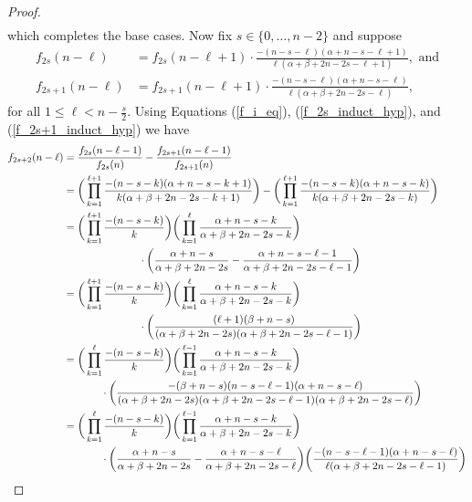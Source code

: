 \documentclass{amsart}
\theoremstyle{plain}
\theoremstyle{remark}
\begin{document}
\begin{proof}
\begin{align*}
\end{align*}
which completes the base cases. Now fix $s\in\{0,\ldots,n-2\}$ and suppose 
\begin{align} \label{f_2s_induct_hyp}
    f_{2s}(n-\ell)&=f_{2s}(n-\ell+1)\cdot\frac{-(n-s-\ell)(\alpha+n-s-\ell+1)}{\ell(\alpha+\beta+2n-2s-\ell+1)},\text{ and} \\
 \label{f_2s+1_induct_hyp}
    f_{2s+1}(n-\ell)&=f_{2s+1}(n-\ell+1)\cdot\frac{-(n-s-\ell)(\alpha+n-s-\ell)}{\ell(\alpha+\beta+2n-2s-\ell)},
\end{align}
for all $1\le \ell<n-\frac{s}{2}$. Using Equations (\ref{f_i_eq}), (\ref{f_2s_induct_hyp}), and (\ref{f_2s+1_induct_hyp}) we have
\begin{align}
f_{2s+2}(n-\ell)&=\frac{f_{2s}(n-\ell-1)}{f_{2s}(n)}-\frac{f_{2s+1}(n-\ell-1)}{f_{2s+1}(n)}\notag \\
&=\bigg(\prod_{k=1}^{\ell+1}\frac{-(n-s-k)(\alpha+n-s-k+1)}{k(\alpha+\beta+2n-2s-k+1)}\bigg)-\bigg(\prod_{k=1}^{\ell+1}\frac{-(n-s-k)(\alpha+n-s-k)}{k(\alpha+\beta+2n-2s-k)}\bigg)\notag \\
&=\bigg(\prod_{k=1}^{\ell+1}\frac{-(n-s-k)}{k}\bigg)\bigg(\prod_{k=1}^\ell\frac{\alpha+n-s-k}{\alpha+\beta+2n-2s-k}\bigg) \notag 
\\&\hspace{1in}\cdot\bigg(\frac{\alpha+n-s}{\alpha+\beta+2n-2s}-\frac{\alpha+n-s-\ell-1}{\alpha+\beta+2n-2s-\ell-1}\bigg)\notag  \\
&=\bigg(\prod_{k=1}^{\ell+1}\frac{-(n-s-k)}{k}\bigg)\bigg(\prod_{k=1}^\ell\frac{\alpha+n-s-k}{\alpha+\beta+2n-2s-k}\bigg) \notag 
\\&\hspace{1in}\cdot\bigg(\frac{(\ell+1)(\beta+n-s)}{(\alpha+\beta+2n-2s)(\alpha+\beta+2n-2s-\ell-1)}\bigg)\notag \\
&=\bigg(\prod_{k=1}^{\ell}\frac{-(n-s-k)}{k}\bigg)\bigg(\prod_{k=1}^{\ell-1}\frac{\alpha+n-s-k}{\alpha+\beta+2n-2s-k}\bigg) \notag 
\\&\hspace{0.5in}\cdot\bigg(\frac{-(\beta+n-s)(n-s-\ell-1)(\alpha+n-s-\ell)}{(\alpha+\beta+2n-2s)(\alpha+\beta+2n-2s-\ell-1)(\alpha+\beta+2n-2s-\ell)}\bigg)\notag \\
&=\bigg(\prod_{k=1}^{\ell}\frac{-(n-s-k)}{k}\bigg)\bigg(\prod_{k=1}^{\ell-1}\frac{\alpha+n-s-k}{\alpha+\beta+2n-2s-k}\bigg) \notag 
\\&\hspace{0.5in}\cdot\bigg(\frac{\alpha+n-s}{\alpha+\beta+2n-2s}-\frac{\alpha+n-s-\ell}{\alpha+\beta+2n-2s-\ell}\bigg)\bigg(\frac{-(n-s-\ell-1)(\alpha+n-s-\ell)}{\ell(\alpha+\beta+2n-2s-\ell-1)}\bigg)\notag \\

\end{align}
\end{proof}
\end{document}
